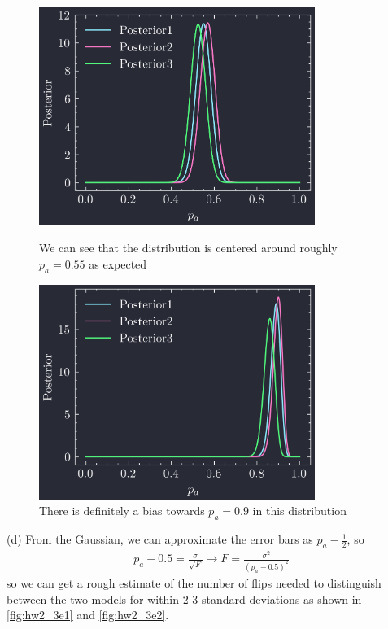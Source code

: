 \documentclass[../main.tex]{subfiles}
\begin{document}
\begin{figure}[ht]
    \centering
    \begin{minipage}{0.5\textwidth}
        \centering
        \includegraphics[width=0.8\textwidth]{hw2_3d1.png}
        \captionsetup{width=0.8\linewidth}
        \caption{We can see that the distribution is centered around roughly $p_a = 0.55$ as expected}
        \label{fig:hw2_3d1}
    \end{minipage}%
    \begin{minipage}{0.5\textwidth}
        \centering
        \includegraphics[width=0.8\textwidth]{hw2_3d2.png}
        \captionsetup{width=0.8\linewidth}
        \caption{There is definitely a bias towards $p_a = 0.9$ in this distribution}
        \label{fig:hw2_3d2}
    \end{minipage}
\end{figure}

\newpage
(d) From the Gaussian, we can approximate the error bars as $p_a - \frac{1}{2}$, so
\begin{align*}
    p_a - 0.5 = \frac{\sigma}{\sqrt{F}} \to F = \frac{\sigma^2}{(p_a - 0.5)^2}
\end{align*}
so we can get a rough estimate of the number of flips needed to distinguish between the two models
for within 2-3 standard deviations as shown in \ref{fig:hw2_3e1} and \ref{fig:hw2_3e2}.
\end{document}
